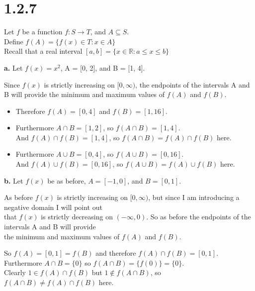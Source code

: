\documentclass{article}
\begin{document}
\newpage
\section*{1.2.7}
\begin{center}
    Let $f$ be a function $f: S \rightarrow T$, and $A\subseteq S.$
    \\Define $f(A) = \{f(x)\in T: x\in A\}$
    \\Recall that a real interval $[a, b] = \{x\in \mathbb{R}: a \leq x \leq b\}$
\end{center}

{\Large \textbf{a.}} Let $f(x) = x^2$, A = [0, 2], and B = [1, 4].
\begin{center}
    \doublespacing
    \begin{singlespace}
        Since $f(x)$ is strictly increasing on $[0, \infty)$, the endpoints of the intervals A and B will provide the minimum and maximum values of $f(A)$ and $f(B)$.
    \end{singlespace}
    \begin{itemize}
        \item Therefore $f(A) = [0, 4]$ and $f(B) = [1, 16]$.
        \item \begin{singlespace}
            Furthermore $A\cap B = [1, 2]$, so $f(A\cap B) = [1, 4]$.
            \\And $f(A)\cap f(B) = [1, 4]$, so $f(A\cap B) = f(A)\cap f(B)$ here.
            \end{singlespace}
        \item \begin{singlespace}
            Furthermore $A\cup B = [0, 4]$, so $f(A\cup B) = [0, 16]$.
        \\And $f(A)\cup f(B) = [0, 16]$, so $f(A\cup B) = f(A)\cup f(B)$ here.
        \end{singlespace}
    \end{itemize}
\end{center}

{\Large \textbf{b.}} Let $f(x)$ be as before, $A = [-1, 0]$, and $B = [0, 1]$.
\begin{center}
    \doublespacing
    \begin{singlespace}
        As before $f(x)$ is strictly increasing on $[0, \infty)$, but since I am introducing a negative domain I will point out 
        \\that $f(x)$ is strictly decreasing on $(-\infty, 0)$. So as before the endpoints of the intervals A and B will provide 
        \\the minimum and maximum values of $f(A)$ and $f(B)$.
    \end{singlespace}
    So $f(A) = [0, 1] = f(B)$ and therefore $f(A)\cap f(B) = [0, 1]$.
    \\Furthermore $A\cap B = \{0\}$ so $f(A\cap B) = \{f(0)\} = \{0\}$.
    \\Clearly $1\in f(A)\cap f(B)$ but $1\notin f(A\cap B)$, so $f(A\cap B)\neq f(A)\cap f(B)$ here.
\end{center}
\end{document}
